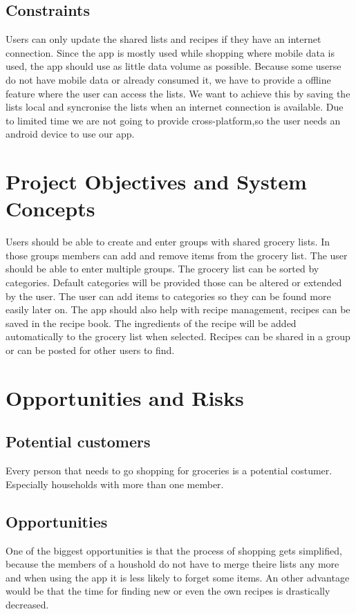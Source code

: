 \documentclass[12pt]{article}
\theoremstyle{definition}
\begin{document}
\subsection{Constraints}
Users can only update the shared lists and recipes if they have an internet connection. Since the app is mostly used while shopping where mobile data is used, the app should use as little data volume as possible. Because some userse do not have mobile data or already consumed it, we have to provide a offline feature where the user can access the lists. We want to achieve this by saving the lists local and syncronise the lists when an internet connection is available.
Due to limited time we are not going to provide cross-platform,so the user needs an android device to use our app.

\pagebreak

\section{Project Objectives and System Concepts}

Users should be able to create and enter groups with shared grocery lists. In those groups members can add and remove items from the grocery list. The user should be able to enter multiple groups. The grocery list can be sorted by categories. Default categories will be provided those can be altered or extended by the user. The user can add items to categories so they can be found more easily later on. The app should also help with recipe management, recipes can be saved in the recipe book. The ingredients of the recipe will be added automatically to the grocery list when selected. Recipes can be shared in a group or can be posted for other users to find. 

\pagebreak

\section{Opportunities and Risks}
\subsection{Potential customers}
Every person that needs to go shopping for groceries is a potential costumer.
Especially households with more than one member.

\subsection{Opportunities}
One of the biggest opportunities is that the process of shopping gets simplified, because the members of a houshold do not have to merge theire lists any more and when using the app it is less likely to forget some items. An other advantage would be that the time for finding new or even the own recipes is drastically decreased.
\end{document}

